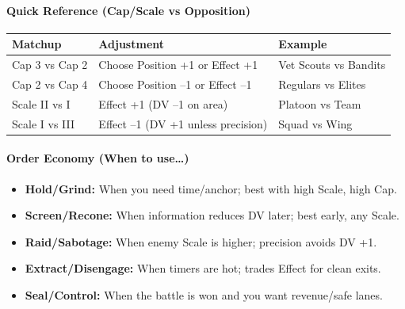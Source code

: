 \documentclass[11pt]{article}
\begin{document}
\paragraph{Quick Reference (Cap/Scale vs Opposition)}
\begin{center}
\small
\begin{longtable}{lll}
\toprule
\textbf{Matchup} & \textbf{Adjustment} & \textbf{Example}\\
\midrule
Cap 3 vs Cap 2 & Choose Position +1 or Effect +1 & Vet Scouts vs Bandits \\
Cap 2 vs Cap 4 & Choose Position --1 or Effect --1 & Regulars vs Elites \\
Scale II vs I  & Effect +1 (DV --1 on area) & Platoon vs Team \\
Scale I vs III  & Effect --1 (DV +1 unless precision) & Squad vs Wing \\
\bottomrule
\end{longtable}
\end{center}

\paragraph{Order Economy (When to use\dots)}
\begin{itemize}[leftmargin=*]
  \item \textbf{Hold/Grind:} When you need time/anchor; best with high Scale, high Cap.
  \item \textbf{Screen/Recone:} When information reduces DV later; best early, any Scale.
  \item \textbf{Raid/Sabotage:} When enemy Scale is higher; precision avoids DV +1.
  \item \textbf{Extract/Disengage:} When timers are hot; trades Effect for clean exits.
  \item \textbf{Seal/Control:} When the battle is won and you want revenue/safe lanes.
\end{itemize}

\end{document}
